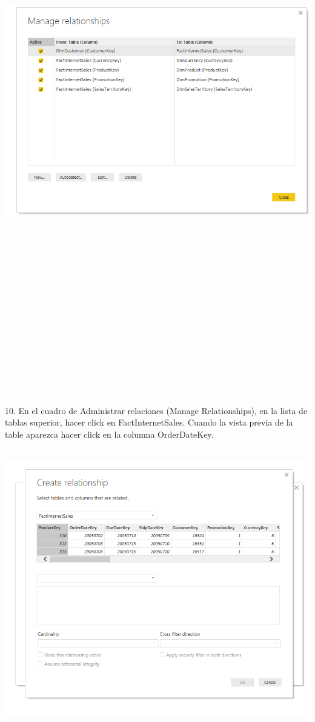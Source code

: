 \begin{flushleft}
\begin{itemize}
\begin{center}
	\includegraphics[width=20cm]{./Imagenes/img3} 
	\end{center}
\textbf{ }\\
\textbf{ }\\
\textbf{ }\\
\textbf{ }\\
\textbf{ }\\
\textbf{ }\\
\textbf{ }\\
\textbf{ }\\
\textbf{ }\\
\textbf{ }\\
\textbf{ }\\
\textbf{ }\\
\textbf{ }\\
\textbf{ }\\
\textbf{ }\\
10. En el cuadro de Administrar relaciones (Manage Relationships), en la lista de tablas superior, hacer click
en FactInternetSales. Cuando la vista previa de la table aparezca hacer click en la columna
OrderDateKey.\\
\textbf{ }\\
\begin{center}
	\includegraphics[width=20cm]{./Imagenes/img4} 

\end{center}
\end{itemize}
\end{flushleft}
